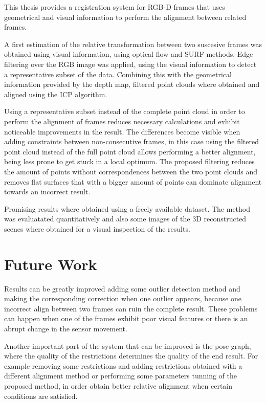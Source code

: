 

This thesis provides a registration system for RGB-D frames that uses geometrical and visual information 
to perform the alignment between related frames.  

A first estimation of the relative transformation between two suscesive frames was obtained using 
visual information, using optical flow and SURF methods. Edge filtering over the RGB image was applied, 
using the visual information to detect a representative subset 
of the data. Combining this with the geometrical information provided by the depth map, filtered point clouds 
where obtained and aligned using the ICP algorithm. 

Using a representative subset instead of the complete point cloud in order to perform the alignment of frames 
reduces necessary calculations and exhibit noticeable improvements in the result. The differences become visible 
when adding constraints between non-consecutive frames, in this case using the filtered point cloud instead of 
the full point cloud allows performing a better alignment, being less prone to get stuck in a local optimum. The 
proposed filtering reduces the amount of points without correspondences between the two point clouds and removes 
flat surfaces that with a bigger amount of points can dominate alignment towards an incorrect result.


Promising results where obtained using a freely available dataset. The method was evaluatated quantitatively and 
also some images of the 3D reconstructed scenes where obtained for a visual inspection of the results.

\section{Future Work}

  Results can be greatly improved adding some outlier detection method and making the corresponding correction when one 
outlier appears, because one incorrect align between two frames can ruin the complete result. These problems can happen 
when one of the frames exhibit poor visual features or there is an abrupt change in the sensor movement. 

  Another important part of the system that can be improved is the pose graph, where the quality of the restrictions 
determines the quality of the end result. For example removing some restrictions and adding restrictions obtained with a 
different alignment method or performing some parameters tunning of the proposed method, in 
order obtain better relative alignment when certain conditions are satisfied.

